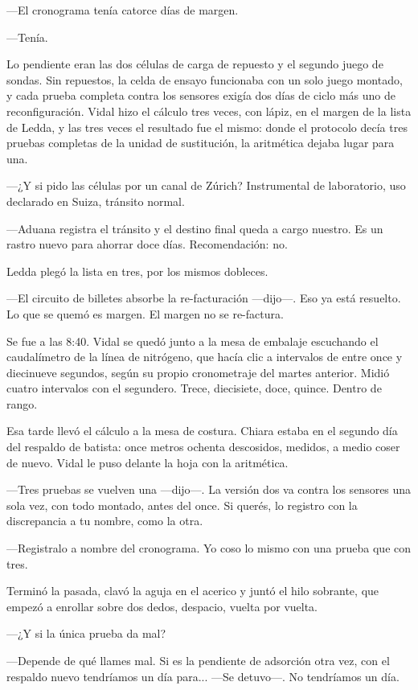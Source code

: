 ---El cronograma tenía catorce días de margen.

---Tenía.

Lo pendiente eran las dos células de carga de repuesto y el segundo juego de sondas. Sin repuestos, la celda de ensayo funcionaba con un solo juego montado, y cada prueba completa contra los sensores exigía dos días de ciclo más uno de reconfiguración. Vidal hizo el cálculo tres veces, con lápiz, en el margen de la lista de Ledda, y las tres veces el resultado fue el mismo: donde el protocolo decía tres pruebas completas de la unidad de sustitución, la aritmética dejaba lugar para una.

---¿Y si pido las células por un canal de Zúrich? Instrumental de laboratorio, uso declarado en Suiza, tránsito normal.

---Aduana registra el tránsito y el destino final queda a cargo nuestro. Es un rastro nuevo para ahorrar doce días. Recomendación: no.

Ledda plegó la lista en tres, por los mismos dobleces.

---El circuito de billetes absorbe la re-facturación ---dijo---. Eso ya está resuelto. Lo que se quemó es margen. El margen no se re-factura.

Se fue a las 8:40. Vidal se quedó junto a la mesa de embalaje escuchando el caudalímetro de la línea de nitrógeno, que hacía clic a intervalos de entre once y diecinueve segundos, según su propio cronometraje del martes anterior. Midió cuatro intervalos con el segundero. Trece, diecisiete, doce, quince. Dentro de rango.

Esa tarde llevó el cálculo a la mesa de costura. Chiara estaba en el segundo día del respaldo de batista: once metros ochenta descosidos, medidos, a medio coser de nuevo. Vidal le puso delante la hoja con la aritmética.

---Tres pruebas se vuelven una ---dijo---. La versión dos va contra los sensores una sola vez, con todo montado, antes del once. Si querés, lo registro con la discrepancia a tu nombre, como la otra.

---Registralo a nombre del cronograma. Yo coso lo mismo con una prueba que con tres.

Terminó la pasada, clavó la aguja en el acerico y juntó el hilo sobrante, que empezó a enrollar sobre dos dedos, despacio, vuelta por vuelta.

---¿Y si la única prueba da mal?

---Depende de qué llames mal. Si es la pendiente de adsorción otra vez, con el respaldo nuevo tendríamos un día para... ---Se detuvo---. No tendríamos un día.

